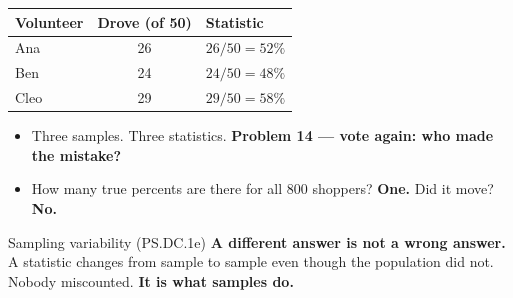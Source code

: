 \documentclass[aspectratio=169, 11pt]{beamer}
\newcommand{\redink}[1]{{\color{redacc}\bfseries #1}}
\begin{document}
\begin{frame}[t, plain]
  \vspace{4pt}
  \begin{center}
    \small
    \renewcommand{\arraystretch}{1.3}
    \begin{tabular}{@{} l c l @{}}
    \hline
    \textbf{Volunteer} & \textbf{Drove (of 50)} & \textbf{Statistic} \\
    \hline
    Ana  & 26 & $26/50 = 52\%$ \\
    Ben  & 24 & $24/50 = 48\%$ \\
    Cleo & 29 & $29/50 = 58\%$ \\
    \hline
    \end{tabular}
  \end{center}
  \vspace{6pt}
  \begin{itemize}\setlength{\itemsep}{4pt}
    \item Three samples. Three statistics. \textbf{Problem 14 --- vote again: who made the mistake?}
    \item How many true percents are there for all 800 shoppers? \redink{One.} Did it move? \redink{No.}
  \end{itemize}
  \begin{block}{Sampling variability (PS.DC.1e)}
    \textbf{A different answer is not a wrong answer.} A statistic changes from sample to
    sample even though the population did not. Nobody miscounted. \redink{It is what samples do.}
  \end{block}
\end{frame}
\end{document}
